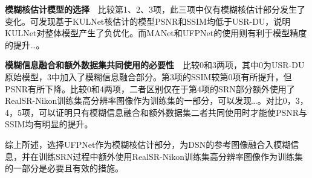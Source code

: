 \noindent\textbf{模糊核估计模型的选择}\ \ 比较第1、2、3项，此三项中仅有模糊核估计部分发生了变化。可发现基于KULNet核估计的模型PSNR和SSIM均低于USR-DU，说明KULNet对整体模型产生了负优化。而MANet和UFPNet的使用则有利于模型精度的提升\dots。

\noindent\textbf{模糊信息融合和额外数据集共同使用的必要性}\ \ 比较0和3两项，其中0为USR-DU原始模型，3中加入了模糊信息融合部分。第3项的SSIM较第0项有所提升，但PSNR有所下降。比较0和4两项，二者区别仅在于第4项的SRN部分额外使用了RealSR-Nikon训练集高分辨率图像作为训练集的一部分，可以发现\dots。对比0，3，4，5项，可以证明只有模糊信息融合和额外数据集二者共同使用时才能使PSNR与SSIM均有明显的提升。

综上所述，选择UFPNet作为模糊核估计部分，为DSN的参考图像融合入模糊信息，并在训练SRN过程中额外使用RealSR-Nikon训练集高分辨率图像作为训练集的一部分是必要且有效的措施。

